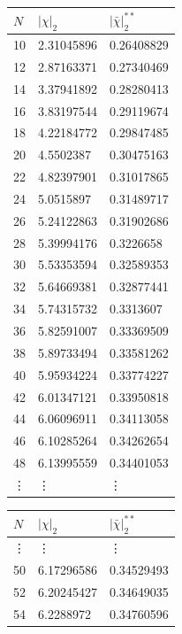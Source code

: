 \documentclass[a4paper,10pt]{article}
\begin{document}
\begin{table}[H]
\center
\begin{minipage}{0.5\textwidth} 
\center
\begin{tabular}{lll}
$N$      & $| \chi |_2$  & $|\bar{\chi} |_2^{**}$    \\
\hline
 10   & 2.31045896 & 0.26408829 \\
 12   & 2.87163371 & 0.27340469 \\
 14   & 3.37941892 & 0.28280413 \\
 16   & 3.83197544 & 0.29119674 \\
 18   & 4.22184772 & 0.29847485 \\
 20   & 4.5502387  & 0.30475163 \\
 22   & 4.82397901 & 0.31017865 \\
 24   & 5.0515897  & 0.31489717 \\
 26   & 5.24122863 & 0.31902686 \\
 28   & 5.39994176 & 0.3226658  \\
 30   & 5.53353594 & 0.32589353 \\
 32   & 5.64669381 & 0.32877441 \\
 34   & 5.74315732 & 0.3313607  \\
 36   & 5.82591007 & 0.33369509 \\
 38   & 5.89733494 & 0.33581262 \\
 40   & 5.95934224 & 0.33774227 \\
 42   & 6.01347121 & 0.33950818 \\
 44   & 6.06096911 & 0.34113058 \\
 46   & 6.10285264 & 0.34262654 \\
 48   & 6.13995559 & 0.34401053 \\
\vdots & \vdots & \vdots  \\ 
\end{tabular}
\end{minipage}%
\begin{minipage}{0.5\textwidth} 
\center
 \begin{tabular}{lll}
  $N$    & $| \chi |_2$  & $|\bar{\chi} |_2^{**}$    \\
\hline
\vdots & \vdots & \vdots  \\ 
 50   & 6.17296586 & 0.34529493 \\
 52   & 6.20245427 & 0.34649035 \\
 54   & 6.2288972  & 0.34760596 \\

\end{tabular}
\end{minipage}
\end{table}
\end{document}
